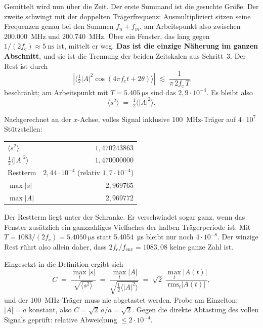 \documentclass[11pt,a4paper]{article}
\newcommand{\crest}{\ensuremath{C}}
\begin{document}
Gemittelt wird nun über die Zeit. Der erste Summand ist die gesuchte Größe.
Der zweite schwingt mit der doppelten Trägerfrequenz: Ausmultipliziert sitzen
seine Frequenzen genau bei den Summen $f_n+f_m$, am Arbeitspunkt also
zwischen \SI{200.000}{\mega\hertz} und \SI{200.740}{\mega\hertz}. Über ein
Fenster, das lang gegen $1/(2f_\mathrm{c}) \approx \SI{5}{\nano\second}$ ist,
mittelt er weg. \textbf{Das ist die einzige Näherung im ganzen Abschnitt}, und
sie ist die Trennung der beiden Zeitskalen aus Schritt~3. Der Rest ist durch
\begin{equation}
  \left|\bigl\langle \tfrac12|A|^2\cos(4\pi f_\mathrm{c}t+2\theta)\bigr\rangle\right|
  \;\lesssim\; \frac{1}{\pi\,2f_\mathrm{c}\,T}
\end{equation}
beschränkt; am Arbeitspunkt mit $T=\SI{5.405}{\micro\second}$ sind das
$2{,}9\cdot10^{-4}$. Es bleibt also
\begin{equation}
  \bigl\langle s^2 \bigr\rangle \;=\; \tfrac12\bigl\langle |A|^2\bigr\rangle .
\end{equation}

Nachgerechnet an der $x$-Achse, volles Signal inklusive
\SI{100}{\mega\hertz}-Träger auf $4\cdot10^{7}$ Stützstellen:
\begin{center}
\begin{tabular}{@{}lr@{}}
  \toprule
  $\langle s^2\rangle$ & $1{,}470243863$\\
  $\tfrac12\langle|A|^2\rangle$ & $1{,}470000000$\\
  Restterm & $2{,}44\cdot10^{-4}$ \quad(relativ $1{,}7\cdot10^{-4}$)\\
  \midrule
  $\max|s|$ & $2{,}969765$\\
  $\max|A|$ & $2{,}969772$\\
  \bottomrule
\end{tabular}
\end{center}
Der Restterm liegt unter der Schranke. Er verschwindet sogar ganz, wenn das
Fenster zusätzlich ein ganzzahliges Vielfaches der halben Trägerperiode ist:
Mit $T = 1083/(2f_\mathrm{c}) = \SI{5.4050}{\micro\second}$ statt
\SI{5.4054}{\micro\second} bleibt nur noch $4\cdot10^{-8}$. Der winzige Rest
rührt also allein daher, dass $2f_\mathrm{c}/f_\mathrm{env} = 1083{,}08$
keine ganze Zahl ist.

Eingesetzt in die Definition ergibt sich
\begin{equation}
  \crest \;=\; \frac{\max_t|s|}{\sqrt{\langle s^2\rangle}}
  \;=\; \frac{\max_t|A|}{\sqrt{\tfrac12\langle |A|^2\rangle}}
  \;=\; \sqrt{2}\;\frac{\max_t |A(t)|}{\mathrm{rms}_t |A(t)|} ,
  \label{eq:crestenv}
\end{equation}
und der \SI{100}{\mega\hertz}-Träger muss nie abgetastet werden. Probe am
Einzelton: $|A| = a$ konstant, also $\crest = \sqrt{2}\,a/a = \sqrt{2}$.
Gegen die direkte Abtastung des vollen Signals geprüft: relative Abweichung
$\le 2\cdot10^{-4}$.
\end{document}

